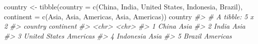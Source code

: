 \documentclass[
]{book}
\newenvironment{Shaded}{\begin{snugshade}}{\end{snugshade}}
\newcommand{\AttributeTok}[1]{\textcolor[rgb]{0.77,0.63,0.00}{#1}}
\newcommand{\CommentTok}[1]{\textcolor[rgb]{0.56,0.35,0.01}{\textit{#1}}}
\newcommand{\FunctionTok}[1]{\textcolor[rgb]{0.00,0.00,0.00}{#1}}
\newcommand{\NormalTok}[1]{#1}
\newcommand{\OtherTok}[1]{\textcolor[rgb]{0.56,0.35,0.01}{#1}}
\newcommand{\StringTok}[1]{\textcolor[rgb]{0.31,0.60,0.02}{#1}}
\begin{document}
\begin{Shaded}
\begin{Highlighting}[]
\NormalTok{country }\OtherTok{\textless{}{-}} 
\FunctionTok{tibble}\NormalTok{(}\AttributeTok{country =} \FunctionTok{c}\NormalTok{(}\StringTok{\textquotesingle{}China\textquotesingle{}}\NormalTok{, }\StringTok{\textquotesingle{}India\textquotesingle{}}\NormalTok{, }\StringTok{\textquotesingle{}United States\textquotesingle{}}\NormalTok{, }\StringTok{\textquotesingle{}Indonesia\textquotesingle{}}\NormalTok{, }\StringTok{\textquotesingle{}Brazil\textquotesingle{}}\NormalTok{),}
       \AttributeTok{continent =} \FunctionTok{c}\NormalTok{(}\StringTok{\textquotesingle{}Asia\textquotesingle{}}\NormalTok{, }\StringTok{\textquotesingle{}Asia\textquotesingle{}}\NormalTok{, }\StringTok{\textquotesingle{}Americas\textquotesingle{}}\NormalTok{, }\StringTok{\textquotesingle{}Asia\textquotesingle{}}\NormalTok{, }\StringTok{\textquotesingle{}Americas\textquotesingle{}}\NormalTok{))}
\NormalTok{country}
\CommentTok{\#\textgreater{} \# A tibble: 5 x 2}
\CommentTok{\#\textgreater{}   country       continent}
\CommentTok{\#\textgreater{}   \textless{}chr\textgreater{}         \textless{}chr\textgreater{}    }
\CommentTok{\#\textgreater{} 1 China         Asia     }
\CommentTok{\#\textgreater{} 2 India         Asia     }
\CommentTok{\#\textgreater{} 3 United States Americas }
\CommentTok{\#\textgreater{} 4 Indonesia     Asia     }
\CommentTok{\#\textgreater{} 5 Brazil        Americas}


\end{Highlighting}
\end{Shaded}
\end{document}
